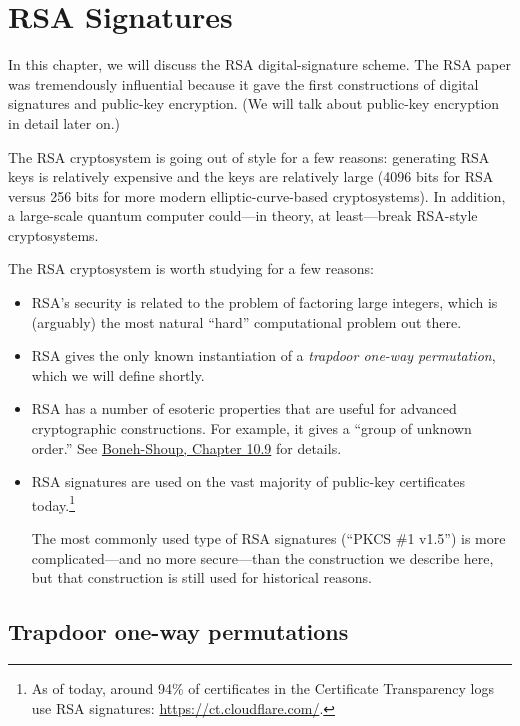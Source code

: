 
\chapter{RSA Signatures}

In this chapter, we will discuss the RSA digital-signature scheme.
The RSA paper\autocite{RSA} was tremendously influential because it gave
the first constructions of digital signatures and public-key encryption.
(We will talk about public-key encryption in detail later on.)

The RSA cryptosystem is going out of style for a few reasons: 
generating RSA keys is relatively expensive and the keys are relatively large
(4096 bits for RSA versus 256 bits for more modern elliptic-curve-based cryptosystems).
In addition, a large-scale quantum computer could---in theory, at least---break
RSA-style cryptosystems.

The RSA cryptosystem is worth studying for a few reasons:
\begin{itemize}
  \item RSA's security is related to the problem of factoring large integers,
        which is (arguably) the most natural ``hard'' computational problem
        out there.
       
  \item RSA gives the only known instantiation of a \emph{trapdoor one-way permutation},
        which we will define shortly.

  \item RSA has a number of esoteric properties that are useful for advanced
        cryptographic constructions. For example, it gives a ``group of unknown order.''
        See
    \href{https://toc.cryptobook.us/book.pdf#page=436}{Boneh-Shoup, Chapter 10.9} for details.

  \item RSA signatures are used on the vast majority of public-key certificates today.\footnote{As
    of today, around 94\% of certificates in the Certificate Transparency logs use RSA signatures:
\url{https://ct.cloudflare.com/}.}

The most commonly used type of RSA signatures (``PKCS \#1 v1.5'') is
more complicated---and no more secure---than the
construction we describe here, but that
construction is still used for historical reasons.

\end{itemize}

\section{Trapdoor one-way permutations}

